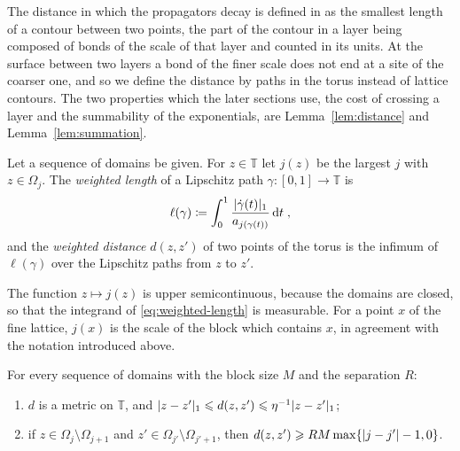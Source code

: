 \documentclass[11pt]{preprint}
\newcommand{\dd}{\mathrm{d}}
\DeclarePairedDelimiter{\abs}{\lvert}{\rvert}
\numberwithin{equation}{section}
\begin{document}
The distance in which the propagators decay is defined in \cite[(2.46), p.~231]{BalabanPRT2} as the smallest length of a contour between two points, the part of the contour in a layer being composed of bonds of the scale of that layer and counted in its units. At the surface between two layers a bond of the finer scale does not end at a site of the coarser one, and so we define the distance by paths in the torus instead of lattice contours. The two properties which the later sections use, the cost of crossing a layer and the summability of the exponentials, are Lemma~\ref{lem:distance} and Lemma~\ref{lem:summation}.

\begin{definition}\label{def:distance}
Let a sequence of domains be given. For $z \in \mathbb T$ let $j(z)$ be the largest $j$ with $z \in \Omega_j$. The \emph{weighted length} of a Lipschitz path $\gamma \colon [0, 1] \to \mathbb T$ is
\begin{equation}\label{eq:weighted-length}
    \ell(\gamma) \coloneqq \int_0^1\frac{\abs{\dot\gamma(t)}_1}{a_{j(\gamma(t))}}\,\dd t\;,
\end{equation}
and the \emph{weighted distance} $d(z, z')$ of two points of the torus is the infimum of $\ell(\gamma)$ over the Lipschitz paths from $z$ to $z'$.
\end{definition}

The function $z \mapsto j(z)$ is upper semicontinuous, because the domains are closed, so that the integrand of \eqref{eq:weighted-length} is measurable. For a point $x$ of the fine lattice, $j(x)$ is the scale of the block which contains $x$, in agreement with the notation introduced above.

\begin{lemma}\label{lem:distance}
For every sequence of domains with the block size $M$ and the separation $R$:
\begin{enumerate}[label=(\roman*)]
\item $d$ is a metric on $\mathbb T$, and $\abs{z - z'}_1 \leqslant d(z, z') \leqslant \eta^{-1}\abs{z - z'}_1$;
\item if $z \in \Omega_j \setminus \Omega_{j+1}$ and $z' \in \Omega_{j'} \setminus \Omega_{j'+1}$, then $d(z, z') \geqslant RM\max\{ \abs{j - j'} - 1, 0 \}$.
\end{enumerate}
\end{lemma}
\end{document}
